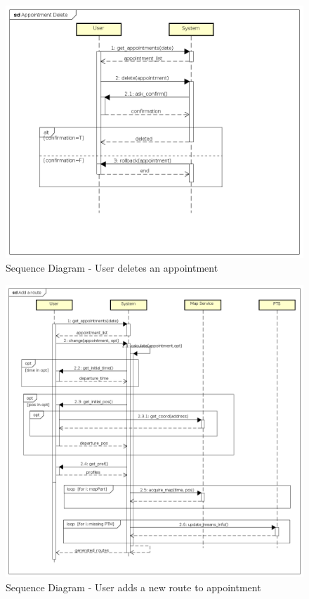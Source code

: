 \begin{figure}
	\centering
	\includegraphics{Images/SequenceDiagrams/6_Appointment_Delete.png}
	\caption{\label{fig: sequenceDiagram6}Sequence Diagram - User deletes an appointment  }
\end{figure}

\begin{figure}
	\centering
	\includegraphics[totalheight = \textheight]{Images/SequenceDiagrams/7_Add_a_route.png}
	\caption{\label{fig: sequenceDiagram7}Sequence Diagram - User adds a new route to appointment  }
\end{figure}

